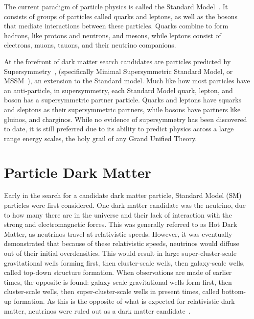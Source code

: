 The current paradigm of particle physics is called the Standard Model~\cite{standardmodel}.
It consists of groups of particles called quarks and leptons, as well as the bosons that mediate interactions between these particles.
Quarks combine to form hadrons, like protons and neutrons, and mesons, while leptons consist of electrons, muons, tauons, and their neutrino companions.

At the forefront of dark matter search candidates are particles predicted by Supersymmetry~\cite{Jungman:1995df}, (specifically Minimal Supersymmetric Standard Model, or MSSM~\cite{MSSM,supersym1}), an extension to the Standard model.
Much like how most particles have an anti-particle, in supersymmetry, each Standard Model quark, lepton, and boson has a supersymmetric partner particle.
Quarks and leptons have squarks and sleptons as their supersymmetric partners, while bosons have partners like gluinos, and charginos.
While no evidence of supersymmetry has been discovered to date, it is still preferred due to its ability to predict physics across a large range energy scales, the holy grail of any Grand Unified Theory.


\section{Particle Dark Matter}\label{sec_particledm}

Early in the search for a candidate dark matter particle, Standard Model (SM) particles were first considered.
One dark matter candidate was the neutrino, due to how many there are in the universe and their lack of interaction with the strong and electromagnetic forces.
This was generally referred to as Hot Dark Matter, as neutrinos travel at relativistic speeds.
However, it was eventually demonstrated that because of these relativistic speeds, neutrinos would diffuse out of their initial overdensities.
This would result in large super-cluster-scale gravitational wells forming first, then cluster-scale wells, then galaxy-scale wells, called top-down structure formation.
When observations are made of earlier times, the opposite is found: galaxy-scale gravitational wells form first, then cluster-scale wells, then super-cluster-scale wells in present times, called bottom-up formation.
As this is the opposite of what is expected for relativistic dark matter, neutrinos were ruled out as a dark matter candidate~\cite{neutrinoHeirarchical}.

